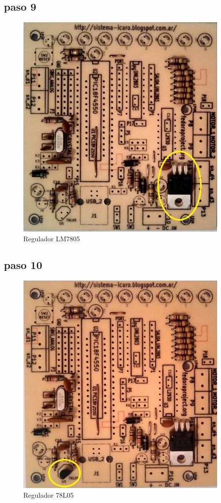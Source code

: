 \documentclass[letterpaper,10pt,english]{sphinxmanual}
\begin{document}
\subsection{paso 9}
\label{np07:paso-9}\begin{figure}[htbp]
\centering
\capstart

\includegraphics[width=300pt]{9b.jpg}
\caption{Regulador LM7805}\end{figure}
\newpage

\subsection{paso 10}
\label{np07:paso-10}\begin{figure}[htbp]
\centering
\capstart

\includegraphics[width=300pt]{10b.jpg}
\caption{Regulador 78L05}\end{figure}
\newpage
\end{document}
